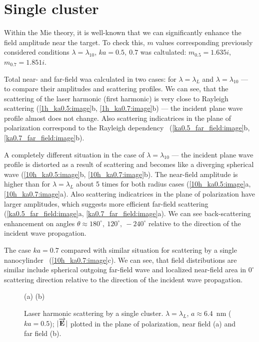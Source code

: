 \section{Single cluster}

Within the Mie theory, it is well-known that we can significantly enhance the field amplitude near the target. To check this, $m$ values corresponding previously considered conditions $\lambda = \lambda_{10}$, $ka = 0.5,\:0.7$ was caltulated: $m_{0.5} = 1.635i$, $m_{0.7} = 1.851i$.

Total near- and far-field waa calculated in two cases: for $\lambda = \lambda_{L}$ and $\lambda = \lambda_{10}$ --- to compare their amplitudes and scattering profiles. We can see, that the scattering of the laser harmonic (first harmonic) is very close to Rayleigh scattering (\autoref{1h_ka0.5:image}b, \ref{1h_ka0.7:image}b) --- the incident plane wave profile almost does not change. Also scattering indicatrices in the plane of polarization correspond to the Rayleigh dependency~\cite{boren_huffman} (\autoref{ka0.5_far_field:image}b, \ref{ka0.7_far_field:image}b).

A completely different situation in the case of $\lambda = \lambda_{10}$ --- the incident plane wave profile is distorted as a result of scattering and becomes like a diverging spherical wave (\autoref{10h_ka0.5:image}b, \ref{10h_ka0.7:image}b). The near-field amplitude is higher than for $\lambda = \lambda_{L}$ about 5 times for both radius cases (\autoref{10h_ka0.5:image}a, \ref{10h_ka0.7:image}a). Also scattering indicatrices in the plane of polarization have larger amplitudes, which suggests more efficient far-field scattering (\autoref{ka0.5_far_field:image}a, \ref{ka0.7_far_field:image}a). We can see back-scattering enhancement on angles $\theta \approx 180^{\circ},\:120^{\circ},\:-240^{\circ}$ relative to the direction of the incident wave propagation.

The case $ka = 0.7$ compared with similar situation for scattering by a single nanocylinder~\cite{andreev_lecz} (\autoref{10h_ka0.7:image}c). We can see, that field distributions are similar include spherical outgoing far-field wave and localized near-field area in $0^{\circ}$ scattering direction relative to the direction of the incident wave propagation.

    \begin{figure}[H]
        (a)\:
        (b)\:
        \caption{Laser harmonic scattering by a single cluster. $\lambda = \lambda_{L}$, $a \approx 6.4$~nm ($ka = 0.5$); $|\overrightarrow{\textbf{E}_{}}|$ plotted in the plane of polarization, near field (a) and far field (b).}
        \label{1h_ka0.5:image}
    \end{figure}

